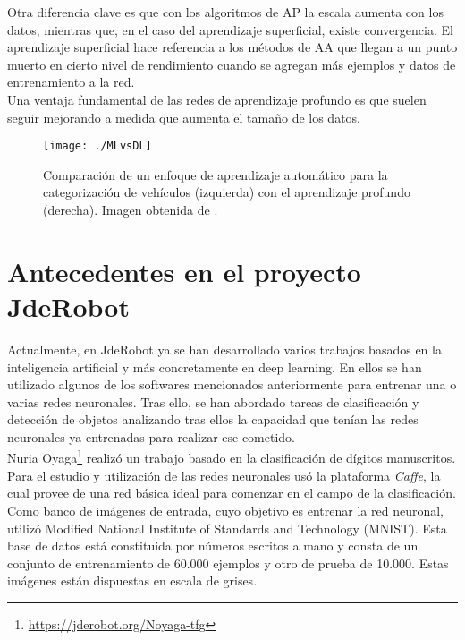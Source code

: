 \documentclass[a4paper, 12pt, spanish, chapterprefix, numbers=noenddot]{book}
\begin{document}
Otra diferencia clave es que con los algoritmos de AP la escala aumenta con los datos, mientras que, en el caso del aprendizaje superficial, existe convergencia. El aprendizaje superficial hace referencia a los métodos de AA que llegan a un punto muerto en cierto nivel de rendimiento cuando se agregan más ejemplos y datos de entrenamiento a la red.\\

Una ventaja fundamental de las redes de aprendizaje profundo es que suelen seguir mejorando a medida que aumenta el tamaño de los datos.\\

\begin{figure}[H]
\begin{center}
\texttt{[image: ./MLvsDL]}
\caption{Comparación de un enfoque de aprendizaje automático para la categorización de vehículos (izquierda) con el aprendizaje profundo (derecha). Imagen obtenida de \cite{SSD_3}.}
\label{MArcoIA}
\end{center}
\end{figure}


\section{Antecedentes en el proyecto JdeRobot}

Actualmente, en JdeRobot ya se han desarrollado varios trabajos basados en la inteligencia artificial y más concretamente en deep learning. En ellos se han utilizado algunos de los softwares mencionados anteriormente para entrenar una o varias redes neuronales. Tras ello, se han abordado tareas de clasificación y detección de objetos analizando tras ellos la capacidad que tenían las redes neuronales ya entrenadas para realizar ese cometido.\\

Nuria Oyaga\footnote{\url{https://jderobot.org/Noyaga-tfg}} realizó un trabajo basado en la clasificación de dígitos manuscritos. Para el estudio y utilización de las redes neuronales usó la plataforma \textit{Caffe}, la cual provee de una red básica ideal para  comenzar en el campo de la clasificación.\\

Como banco de imágenes de entrada, cuyo objetivo es entrenar la red neuronal, utilizó  Modified National Institute of Standards and Technology (MNIST). Esta base de datos está constituida por números escritos a mano y consta de un conjunto de entrenamiento de 60.000 ejemplos y otro de prueba de 10.000. Estas imágenes están dispuestas en escala de grises.\\
\end{document}
